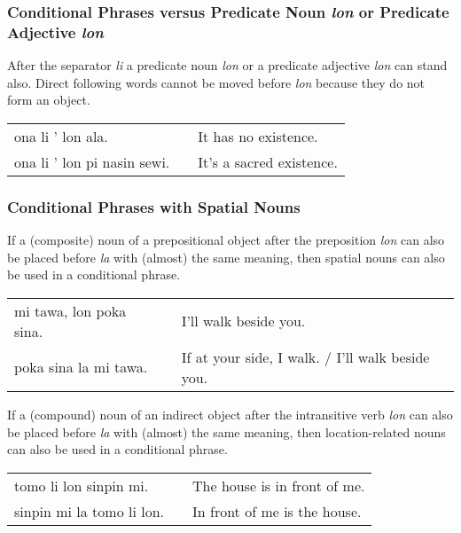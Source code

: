 %
%
\subsubsection*{Conditional Phrases versus Predicate Noun \textit{lon} or Predicate Adjective \textit{lon} }
%
%

After the separator \textit{li} a predicate noun \textit{lon} or a predicate adjective \textit{lon} can stand also. 
Direct following words cannot be moved before \textit{lon} because they do not form an object. 

\begin{supertabular}{p{5,5cm}|ll}
ona li ' lon ala. &&  It has no existence. \\
ona li ' lon pi nasin sewi. && It's a sacred existence. \\
\end{supertabular}

%
%
\subsubsection*{Conditional Phrases with Spatial Nouns}
%
%

If a (composite) noun of a prepositional object after the preposition \textit{lon} can also be placed before \textit{la} with (almost) the same meaning, then spatial nouns can also be used in a conditional phrase. 

\begin{supertabular}{p{5,5cm}|ll}
mi tawa, lon poka sina.  && I'll walk beside you. \\
poka sina la mi tawa.    && If at your side, I walk. / I'll walk beside you.  \\
\end{supertabular} 

If a (compound) noun of an indirect object after the intransitive verb \textit{lon} can also be placed before \textit{la} with (almost) the same meaning, then location-related nouns can also be used in a conditional phrase. 

\begin{supertabular}{p{5,5cm}|ll}
tomo li lon sinpin mi.    && The house is in front of me. \\
sinpin mi la tomo li lon. && In front of me is the house. \\
\end{supertabular}

